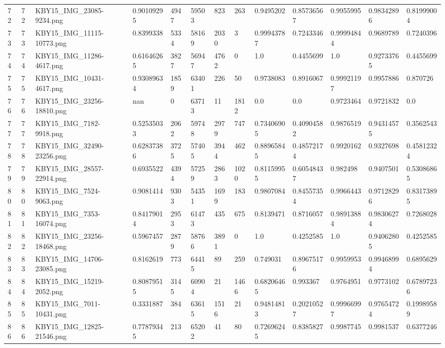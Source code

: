 \documentclass[11pt, a4paper, twoside]{report}
\begin{document}
\begin{longtable}[c]{@{}lllllllllllll@{}}
72 & 72 & KBY15\_IMG\_23085-9234.png & 0.90109295 & 4947 & 59503 & 823 & 263 & 0.9495202 & 0.85736567 & 0.9955995 & 0.98342896 & 0.81999004 \\
73 & 73 & KBY15\_IMG\_11115-10773.png & 0.8399338 & 5334 & 58169 & 2030 & 3 & 0.99943787 & 0.7243346 & 0.99994844 & 0.9689789 & 0.7240396 \\
74 & 74 & KBY15\_IMG\_11286-4617.png & 0.61646265 & 3827 & 56947 & 4762 & 0 & 1.0 & 0.4455699 & 1.0 & 0.92733765 & 0.4455699 \\
75 & 75 & KBY15\_IMG\_10431-4617.png & 0.93089634 & 1859 & 63401 & 226 & 50 & 0.9738083 & 0.8916067 & 0.99921197 & 0.9957886 & 0.870726 \\
76 & 76 & KBY15\_IMG\_23256-18810.png & nan & 0 & 63713 & 11 & 1812 & 0.0 & 0.0 & 0.9723464 & 0.9721832 & 0.0 \\
77 & 77 & KBY15\_IMG\_7182-9918.png & 0.52535033 & 2062 & 59748 & 2979 & 747 & 0.73406905 & 0.40904582 & 0.9876519 & 0.94314575 & 0.3562543 \\
78 & 78 & KBY15\_IMG\_32490-23256.png & 0.62837386 & 3725 & 57405 & 3944 & 462 & 0.88965845 & 0.48572174 & 0.9920162 & 0.9327698 & 0.45812324 \\
79 & 79 & KBY15\_IMG\_28557-22914.png & 0.6935522 & 4394 & 57259 & 2863 & 1020 & 0.81159955 & 0.60548437 & 0.982498 & 0.9407501 & 0.53086865 \\
80 & 80 & KBY15\_IMG\_7524-9063.png & 0.9081414 & 9303 & 54351 & 1699 & 183 & 0.9807084 & 0.84557354 & 0.9966443 & 0.97128296 & 0.83173895 \\
81 & 81 & KBY15\_IMG\_7353-16074.png & 0.84179014 & 2953 & 61473 & 435 & 675 & 0.8139471 & 0.8716057 & 0.98913884 & 0.98306274 & 0.7268028 \\
82 & 82 & KBY15\_IMG\_23256-18468.png & 0.5967457 & 2879 & 58766 & 3891 & 0 & 1.0 & 0.4252585 & 1.0 & 0.94062805 & 0.4252585 \\
83 & 83 & KBY15\_IMG\_14706-23085.png & 0.8162619 & 773 & 64415 & 89 & 259 & 0.749031 & 0.89675176 & 0.9959953 & 0.99468994 & 0.6895629 \\
84 & 84 & KBY15\_IMG\_15219-2052.png & 0.80879515 & 3145 & 60904 & 21 & 1466 & 0.68206465 & 0.993367 & 0.9764951 & 0.9773102 & 0.67897236 \\
85 & 85 & KBY15\_IMG\_7011-10431.png & 0.3331887 & 384 & 63615 & 1516 & 21 & 0.94814813 & 0.20210527 & 0.99966997 & 0.97654724 & 0.19989589 \\
86 & 86 & KBY15\_IMG\_12825-21546.png & 0.77879345 & 213 & 65202 & 41 & 80 & 0.72696245 & 0.8385827 & 0.9987745 & 0.9981537 & 0.6377246 \\

\end{longtable}
\end{document}
